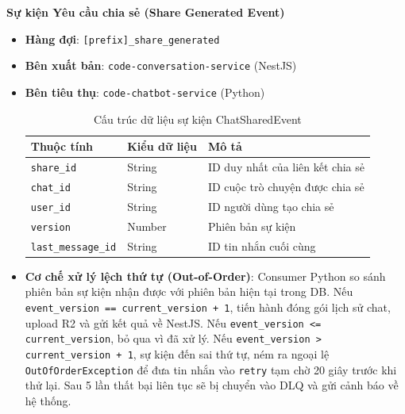 \textbf{Sự kiện Yêu cầu chia sẻ (Share Generated Event)}
\begin{itemize}
\item \textbf{Hàng đợi}: \texttt{[prefix]\_share\_generated}
\item \textbf{Bên xuất bản}: \texttt{code-conversation-service} (NestJS)
\item \textbf{Bên tiêu thụ}: \texttt{code-chatbot-service} (Python)

\begin{table}[H]
\centering
\begin{tabular}{|l|l|l|}
\hline
\textbf{Thuộc tính} & \textbf{Kiểu dữ liệu} & \textbf{Mô tả} \\ \hline
\texttt{share\_id} & String & ID duy nhất của liên kết chia sẻ \\ \hline
\texttt{chat\_id} & String & ID cuộc trò chuyện được chia sẻ \\ \hline
\texttt{user\_id} & String & ID người dùng tạo chia sẻ \\ \hline
\texttt{version} & Number & Phiên bản sự kiện \\ \hline
\texttt{last\_message\_id} & String & ID tin nhắn cuối cùng \\ \hline
\end{tabular}
\caption{Cấu trúc dữ liệu sự kiện ChatSharedEvent}
\end{table}

\item \textbf{Cơ chế xử lý lệch thứ tự (Out-of-Order)}:
Consumer Python so sánh phiên bản sự kiện nhận được
với phiên bản hiện tại trong DB.
Nếu \texttt{event\_version == current\_version + 1},
tiến hành đóng gói lịch sử chat,
upload R2 và gửi kết quả về NestJS.
Nếu \texttt{event\_version <= current\_version},
bỏ qua vì đã xử lý.
Nếu \texttt{event\_version > current\_version + 1},
sự kiện đến sai thứ tự,
ném ra ngoại lệ \texttt{OutOfOrderException}
để đưa tin nhắn vào \texttt{retry}
tạm chờ 20 giây trước khi thử lại.
Sau 5 lần thất bại liên tục sẽ bị chuyển vào
DLQ và gửi cảnh báo về hệ thống.
\end{itemize}


